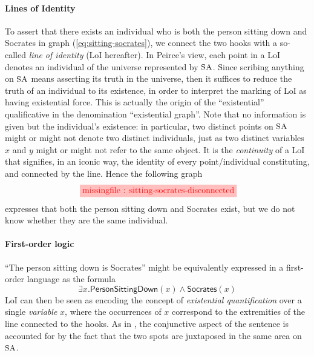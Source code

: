 \paragraph{Lines of Identity} To assert that there exists an individual who is
both the person sitting down and Socrates in graph (\ref{eq:sitting-socrates}),
we connect the two hooks with a so-called \emph{line of identity} (LoI
hereafter). In Peirce's view, each point in a LoI denotes an individual of the
universe represented by $\small\textsc{SA}$. Since scribing anything on $\small\textsc{SA}$ means asserting
its truth in the universe, then it suffices to reduce the truth of an individual
to its existence, in order to interpret the marking of LoI as having existential
force. This is actually the origin of the ``existential'' qualificative in the
denomination ``existential graph''. Note that no information is given but the
individual's existence: in particular, two distinct points on $\small\textsc{SA}$ might or
might not denote two distinct individuals, just as two distinct variables $x$
and $y$ might or might not refer to the same object. It is the \emph{continuity}
of a LoI that signifies, in an iconic way, the identity of every
point/individual constituting, and connected by the line. Hence the following
graph
$$\tikzfig{1}{0.5}{sitting-socrates-disconnected}$$ expresses that both the
person sitting down and Socrates exist, but we do not know whether they are the
same individual.

\paragraph{First-order logic} ``The person sitting down is Socrates'' might be
equivalently expressed in a first-order language as the formula
\begin{equation}
  \exists x. \mathsf{PersonSittingDown}(x) \wedge \mathsf{Socrates}(x) \label{eq:sitting-socrates-fo}
\end{equation}
LoI can then be seen as encoding the concept of \emph{existential
quantification} over a single \emph{variable} $x$, where the occurrences of $x$
correspond to the extremities of the line connected to the hooks. As in
, the conjunctive aspect of the sentence is accounted for by the fact
that the two spots are juxtaposed in the same area on $\small\textsc{SA}$.

